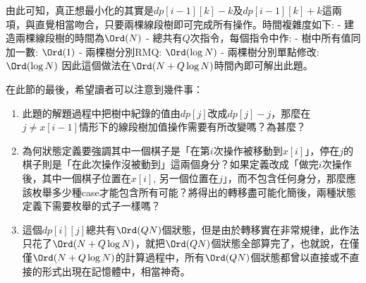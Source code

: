 由此可知，真正想最小化的其實是$dp[i - 1][k] - k$及$dp[i - 1][k] + k$這兩項，與直覺相當吻合，只要兩棵線段樹即可完成所有操作。時間複雜度如下: \newline
\hspace*{1cm} - 建造兩棵線段樹的時間為$\Ord(N)$ \newline
\hspace*{1cm} - 總共有$Q$次指令，每個指令中作:\newline
\hspace*{2cm} - 樹中所有值同加一數: $\Ord(1)$\newline
\hspace*{2cm} - 兩棵樹分別RMQ: \hspace*{0.6cm}$\Ord(\log N)$\newline
\hspace*{2cm} - 兩棵樹分別單點修改: $\Ord(\log N)$\newline \newline
因此這個做法在$\Ord(N + Q\log N)$時間內即可解出此題。

在此節的最後，希望讀者可以注意到幾件事：
\begin{enumerate}
\item 此題的解題過程中把樹中紀錄的值由$dp[j]$改成$dp[j] - j$，那麼在$j \neq x[i - 1]$情形下的線段樹加值操作需要有所改變嗎？為甚麼？
\item 為何狀態定義要強調其中一個棋子是「在第$i$次操作被移動到$x[i]$」，停在$j$的棋子則是「在此次操作沒被動到」這兩個身分？如果定義改成「做完$i$次操作後，其中一個棋子位置在$x[i]$, 另一個位置在$j$」，而不包含任何身分，那麼應該枚舉多少種case才能包含所有可能？將得出的轉移盡可能化簡後，兩種狀態定義下需要枚舉的式子一樣嗎？
\item 這個$dp[i][j]$總共有$\Ord(QN)$個狀態，但是由於轉移實在非常規律，此作法只花了$\Ord(N + Q \log N)$，就把$\Ord(QN)$個狀態全部算完了，也就說，在僅僅$\Ord(N + Q\log N)$的計算過程中，所有$\Ord(QN)$個狀態都曾以直接或不直接的形式出現在記憶體中，相當神奇。
\end{enumerate}

